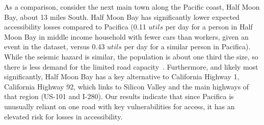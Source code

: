 As a comparison, consider the next main town along the Pacific coast, Half Moon Bay, about 13 miles South. Half Moon Bay has significantly lower expected accessibility losses compared to Pacifica (0.11 $utils$ per day for a person in Half Moon Bay in middle income household with fewer cars than workers, given an event in the dataset, versus 0.43 $utils$ per day for a similar person in Pacifica). %
While the seismic hazard is similar, the population is about one third the size, so there is less demand for the limited road capacity~\cite{u.s._bureau_of_the_census_united_2010}. Furthermore, and likely most significantly, Half Moon Bay has a key alternative to California Highway 1, California Highway 92, which links to Silicon Valley and the main highways of that region (US-101 and I-280). %
Our results indicate that since Pacifica is unusually reliant on one road with key vulnerabilities for access, it has an elevated risk for losses in accessibility.





